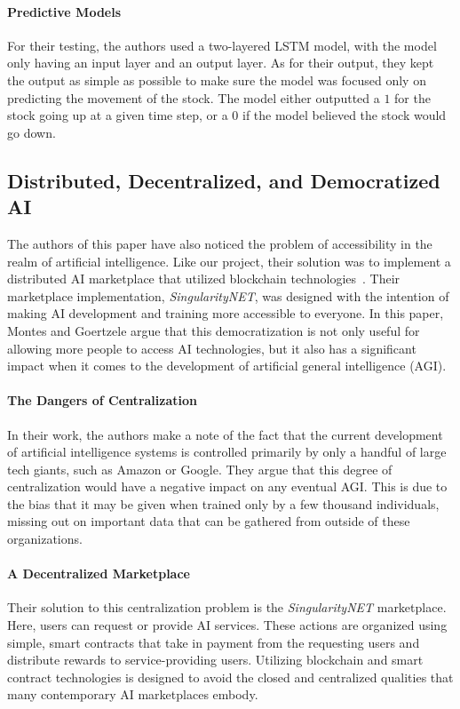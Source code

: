 \documentclass{ledger}
\begin{document}
\paragraph{Predictive Models}
For their testing, the authors used a two-layered LSTM model, with the model only having an input layer and an output
layer.  As for their output, they kept the output as simple as possible to make sure the model was focused only on
predicting the movement of the stock.  The model either outputted a $1$ for the stock going up at a given time step,
or a $0$ if the model believed the stock would go down.


\subsection{Distributed, Decentralized, and Democratized AI}

The authors of this paper have also noticed the problem of accessibility in the realm of artificial intelligence.  Like
our project, their solution was to implement a distributed AI marketplace that utilized blockchain
technologies~\cite{democratizedAI}.  Their marketplace implementation, \textit{SingularityNET}, was designed with the
intention of making AI development and training more accessible to everyone.  In this paper, Montes and Goertzele argue
that this democratization is not only useful for allowing more people to access AI technologies, but it also has a
significant impact when it comes to the development of artificial general intelligence (AGI).

\paragraph{The Dangers of Centralization}  In their work, the authors make a note of the fact that the current development
of artificial intelligence systems is controlled primarily by only a handful of large tech giants, such as Amazon or
Google. They argue that this degree of centralization would have a negative impact on any eventual AGI.  This is due
to the bias that it may be given when trained only by a few thousand individuals, missing out on important data that can
be gathered from outside of these organizations.

\paragraph{A Decentralized Marketplace}  Their solution to this centralization problem is the \textit{SingularityNET}
marketplace.  Here, users can request or provide AI services.  These actions are organized using simple, smart contracts
that take in payment from the requesting users and distribute rewards to service-providing users.  Utilizing blockchain
and smart contract technologies is designed to avoid the closed and centralized qualities that many contemporary AI
marketplaces embody.
\end{document}
